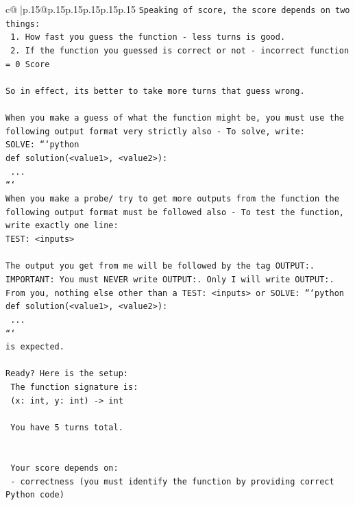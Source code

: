 \documentclass{article}
\begin{document}
{\begin{supertabular}{c@{$\;$}|p{.15\linewidth}@{}p{.15\linewidth}p{.15\linewidth}p{.15\linewidth}p{.15\linewidth}p{.15\linewidth}}
{{{\texttt{Speaking of score, the score depends on two things:} \\
\texttt{    1. How fast you guess the function {-} less turns is good.} \\
\texttt{    2. If the function you guessed is correct or not {-} incorrect function = 0 Score} \\
\\ 
\texttt{So in effect, its better to take more turns that guess wrong.} \\
\\ 
\texttt{When you make a guess of what the function might be, you must use the following output format very strictly also {-} To solve, write:} \\
\texttt{SOLVE: ```python} \\
\texttt{def solution(<value1>, <value2>):} \\
\texttt{    ...} \\
\texttt{```} \\
\texttt{When you make a probe/ try to get more outputs from the function the following output format must be followed also {-} To test the function, write exactly one line:} \\
\texttt{TEST: <inputs>} \\
\\ 
\texttt{The output you get from me will be followed by the tag OUTPUT:.} \\
\texttt{IMPORTANT: You must NEVER write OUTPUT:. Only I will write OUTPUT:.} \\
\texttt{From you, nothing else other than a TEST: <inputs> or SOLVE: ```python} \\
\texttt{def solution(<value1>, <value2>):} \\
\texttt{    ...} \\
\texttt{```} \\
\texttt{is expected.} \\
\\ 
\texttt{Ready? Here is the setup:} \\
\texttt{	The function signature is:} \\
\texttt{	(x: int, y: int) {-}> int} \\
\\ 
\texttt{	You have 5 turns total.} \\
\\ 
\\ 
\texttt{	Your score depends on:} \\
\texttt{		{-} correctness (you must identify the function by providing correct Python code)} \\
}}}
\end{supertabular}}
\end{document}
